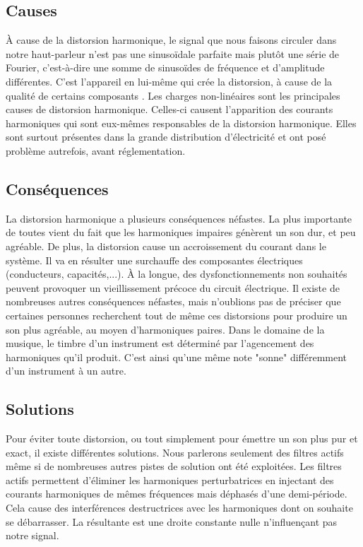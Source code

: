 \subsection{Causes}
À cause de la distorsion harmonique, le signal que nous faisons circuler dans notre haut-parleur n'est pas
une sinusoïdale parfaite mais plutôt une série de Fourier, c'est-à-dire une somme de sinusoïdes de 
fréquence et d'amplitude différentes. C'est l'appareil en lui-même qui crée la distorsion, à cause de la qualité
de certains composants\cite{cuccia} \cite{termans}.
Les charges non-linéaires sont les principales causes de distorsion harmonique. Celles-ci causent 
l'apparition des courants harmoniques qui sont eux-mêmes responsables de la distorsion harmonique. Elles sont 
surtout présentes dans la grande distribution d'électricité et ont posé problème autrefois, avant réglementation\cite{chargeslin}.

\subsection{Conséquences}
La distorsion harmonique a plusieurs conséquences néfastes.
La plus importante de toutes vient du fait que les harmoniques impaires génèrent un son dur, et peu agréable. De plus, la distorsion cause un accroissement 
du courant dans le système. Il va en résulter une surchauffe des composantes électriques (conducteurs, 
capacités,...). À la longue, des dysfonctionnements non souhaités peuvent provoquer un vieillissement 
précoce du circuit électrique\cite{brevet2}. Il existe de nombreuses autres conséquences néfastes, 
mais n'oublions pas de préciser que certaines personnes recherchent tout de même ces distorsions pour 
produire un son plus agréable, au moyen d'harmoniques paires. Dans le domaine de la musique, le timbre 
d'un instrument est déterminé par l'agencement des harmoniques qu'il produit. C'est ainsi qu'une même note
"sonne" différemment d'un instrument à un autre.

\subsection{Solutions}
Pour éviter toute distorsion, ou tout simplement pour émettre un son plus pur et exact, 
il existe différentes solutions. Nous parlerons seulement des filtres actifs 
même si de nombreuses autres pistes de solution ont été exploitées.
Les filtres actifs permettent d'éliminer les harmoniques perturbatrices en injectant des courants
harmoniques de mêmes fréquences mais déphasés d'une demi-période. Cela cause des interférences
destructrices avec les harmoniques dont on souhaite se débarrasser. La résultante est une droite constante
nulle n'influençant pas notre signal\cite{brevet1}.





